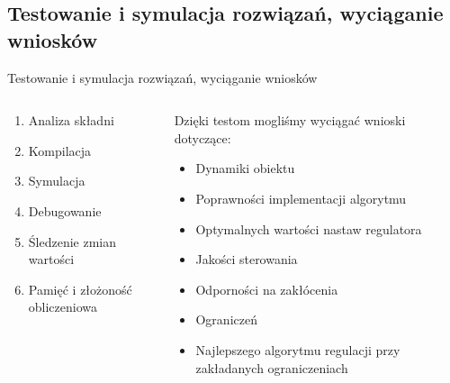 \documentclass{beamer}
\begin{document}
	\subsection{Testowanie i symulacja rozwiązań, wyciąganie wniosków}
	\begin{frame}{Testowanie i symulacja rozwiązań, wyciąganie wniosków}
		\begin{columns}
			\begin{column}{0.45\textwidth}
				\begin{enumerate}
					\item Analiza składni
					\item Kompilacja
					\item Symulacja
					\item Debugowanie
					\item Śledzenie zmian wartości
					\item Pamięć i złożoność obliczeniowa
				\end{enumerate}
			\end{column}
			\begin{column}{0.45\textwidth}
				\begin{block}{Dzięki testom mogliśmy wyciągać wnioski dotyczące:}
					\begin{itemize}
						\item Dynamiki obiektu
						\item Poprawności implementacji algorytmu
						\item Optymalnych wartości nastaw regulatora
						\item Jakości sterowania
						\item Odporności na zakłócenia
						\item Ograniczeń
						\item Najlepszego algorytmu regulacji przy zakładanych ograniczeniach
					\end{itemize}
				\end{block}
			\end{column}
		\end{columns}
	\end{frame}
	
\end{document}
